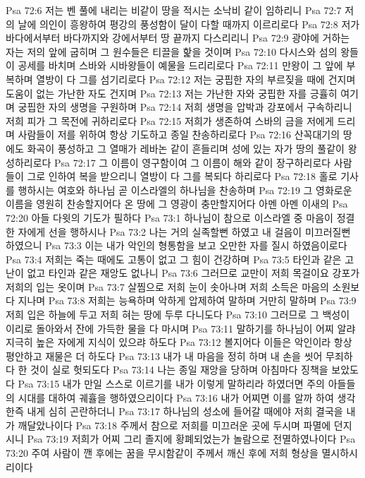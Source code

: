 Psa 72:6  저는 벤 풀에 내리는 비같이 땅을 적시는 소낙비 같이 임하리니
Psa 72:7  저의 날에 의인이 흥왕하여 평강의 풍성함이 달이 다할 때까지 이르리로다
Psa 72:8  저가 바다에서부터 바다까지와 강에서부터 땅 끝까지 다스리리니
Psa 72:9  광야에 거하는 자는 저의 앞에 굽히며 그 원수들은 티끌을 핥을 것이며
Psa 72:10  다시스와 섬의 왕들이 공세를 바치며 스바와 시바왕들이 예물을 드리리로다
Psa 72:11  만왕이 그 앞에 부복하며 열방이 다 그를 섬기리로다
Psa 72:12  저는 궁핍한 자의 부르짖을 때에 건지며 도움이 없는 가난한 자도 건지며
Psa 72:13  저는 가난한 자와 궁핍한 자를 긍휼히 여기며 궁핍한 자의 생명을 구원하며
Psa 72:14  저희 생명을 압박과 강포에서 구속하리니 저희 피가 그 목전에 귀하리로다
Psa 72:15  저희가 생존하여 스바의 금을 저에게 드리며 사람들이 저를 위하여 항상 기도하고 종일 찬송하리로다
Psa 72:16  산꼭대기의 땅에도 화곡이 풍성하고 그 열매가 레바논 같이 흔들리며 성에 있는 자가 땅의 풀같이 왕성하리로다
Psa 72:17  그 이름이 영구함이여 그 이름이 해와 같이 장구하리로다 사람들이 그로 인하여 복을 받으리니 열방이 다 그를 복되다 하리로다
Psa 72:18  홀로 기사를 행하시는 여호와 하나님 곧 이스라엘의 하나님을 찬송하며
Psa 72:19  그 영화로운 이름을 영원히 찬송할지어다 온 땅에 그 영광이 충만할지어다 아멘 아멘 이새의
Psa 72:20  아들 다윗의 기도가 필하다
Psa 73:1  하나님이 참으로 이스라엘 중 마음이 정결한 자에게 선을 행하시나
Psa 73:2  나는 거의 실족할뻔 하였고 내 걸음이 미끄러질뻔 하였으니
Psa 73:3  이는 내가 악인의 형통함을 보고 오만한 자를 질시 하였음이로다
Psa 73:4  저희는 죽는 때에도 고통이 없고 그 힘이 건강하며
Psa 73:5  타인과 같은 고난이 없고 타인과 같은 재앙도 없나니
Psa 73:6  그러므로 교만이 저희 목걸이요 강포가 저희의 입는 옷이며
Psa 73:7  살찜으로 저희 눈이 솟아나며 저희 소득은 마음의 소원보다 지나며
Psa 73:8  저희는 능욕하며 악하게 압제하여 말하며 거만히 말하며
Psa 73:9  저희 입은 하늘에 두고 저희 혀는 땅에 두루 다니도다
Psa 73:10  그러므로 그 백성이 이리로 돌아와서 잔에 가득한 물을 다 마시며
Psa 73:11  말하기를 하나님이 어찌 알랴 지극히 높은 자에게 지식이 있으랴 하도다
Psa 73:12  볼지어다 이들은 악인이라 항상 평안하고 재물은 더 하도다
Psa 73:13  내가 내 마음을 정히 하며 내 손을 씻어 무죄하다 한 것이 실로 헛되도다
Psa 73:14  나는 종일 재앙을 당하며 아침마다 징책을 보았도다
Psa 73:15  내가 만일 스스로 이르기를 내가 이렇게 말하리라 하였더면 주의 아들들의 시대를 대하여 궤휼을 행하였으리이다
Psa 73:16  내가 어찌면 이를 알까 하여 생각한즉 내게 심히 곤란하더니
Psa 73:17  하나님의 성소에 들어갈 때에야 저희 결국을 내가 깨달았나이다
Psa 73:18  주께서 참으로 저희를 미끄러운 곳에 두시며 파멸에 던지시니
Psa 73:19  저희가 어찌 그리 졸지에 황폐되었는가 놀람으로 전멸하였나이다
Psa 73:20  주여 사람이 깬 후에는 꿈을 무시함같이 주께서 깨신 후에 저희 형상을 멸시하시리이다
